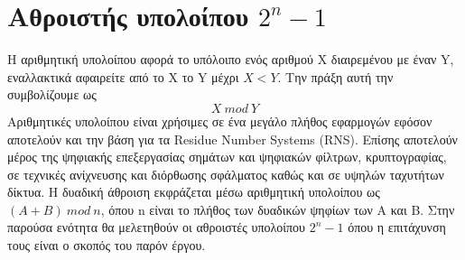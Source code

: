 \section{Αθροιστής υπολοίπου $2^n-1$}
\label{section:mod_addition}
Η αριθμητική υπολοίπου αφορά το υπόλοιπο ενός αριθμού X διαιρεμένου με έναν Y, εναλλακτικά
αφαιρείτε από το Χ το Y μέχρι $X < Y$. Την πράξη αυτή την συμβολίζουμε ως 
\begin{equation*}
    X\ mod\ Y
\end{equation*}
Αριθμητικές υπολοίπου είναι χρήσιμες σε ένα μεγάλο πλήθος εφαρμογών εφόσον αποτελούν και 
την βάση για τα Residue Number Systems (RNS). Επίσης αποτελούν μέρος της ψηφιακής
επεξεργασίας σημάτων και ψηφιακών φίλτρων, κρυπτογραφίας, σε τεχνικές ανίχνευσης και διόρθωσης σφάλματος καθώς και σε υψηλών ταχυτήτων δίκτυα. Η δυαδική άθροιση εκφράζεται μέσω αριθμητική υπολοίπου ως $(A+B)\ mod\ n$, όπου n είναι το πλήθος των δυαδικών ψηφίων των A και B. Στην παρούσα ενότητα θα μελετηθούν οι αθροιστές υπολοίπου $2^n-1$ όπου η επιτάχυνση τους είναι ο σκοπός του παρόν έργου.






